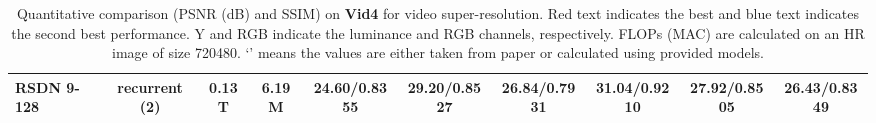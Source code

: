 \begin{table}[t]
{\begin{tabular}{l||c|c|c||c|c|c|c|c||c}
			\\
			RSDN 9-128 & recurrent (2)  &0.13T &6.19M &{\color{red}24.60}/{\color{red}0.8355}	 & {\color{red}29.20}/{\color{red}0.8527}  &{\color{red}26.84}/{\color{red}0.7931}  &{\color{red}31.04}/{\color{red}0.9210} &{\color{red}27.92}/{\color{red}0.8505}  &{\color{red}26.43}/{\color{red}0.8349}
			\\
			\hline
		\end{tabular}
	}
	\vspace{3mm}
	\caption{Quantitative comparison (PSNR (dB) and SSIM) on \textbf{Vid4} for  video super-resolution. {\color{red}Red} text indicates the best and {\color{blue} blue} text indicates the second best performance. Y and RGB indicate the luminance and RGB channels, respectively. FLOPs (MAC) are calculated on an HR image of size 720480. `' means the values are either taken from paper or calculated using provided models. } 
	\label{vid4_table}
\end{table}



